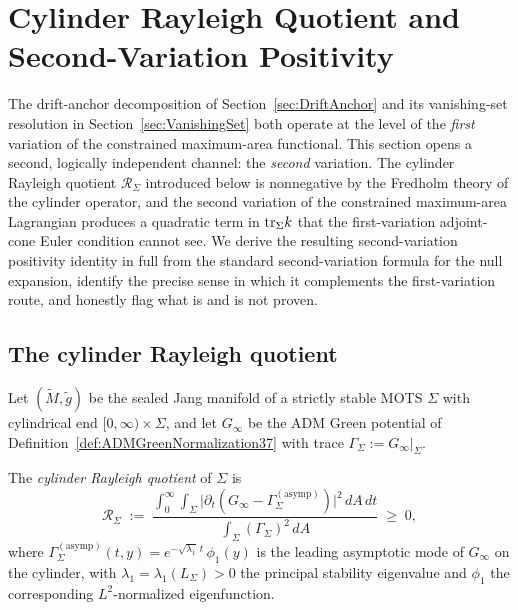 \section{Cylinder Rayleigh Quotient and Second-Variation Positivity}
\label{sec:CylinderRayleigh}

The drift-anchor decomposition of Section~\ref{sec:DriftAnchor} and its vanishing-set resolution in Section~\ref{sec:VanishingSet} both operate at the level of the \emph{first} variation of the constrained maximum-area functional. This section opens a second, logically independent channel: the \emph{second} variation. The cylinder Rayleigh quotient $\mathcal R_\Sigma$ introduced below is nonnegative by the Fredholm theory of the cylinder operator, and the second variation of the constrained maximum-area Lagrangian produces a quadratic term in $\mathrm{tr}_\Sigma k$ that the first-variation adjoint-cone Euler condition cannot see. We derive the resulting second-variation positivity identity in full from the standard second-variation formula for the null expansion, identify the precise sense in which it complements the first-variation route, and honestly flag what is and is not proven.

\subsection{The cylinder Rayleigh quotient}

Let $(\widetilde M,\widetilde g)$ be the sealed Jang manifold of a strictly stable MOTS $\Sigma$ with cylindrical end $[0,\infty)\times\Sigma$, and let $G_\infty$ be the ADM Green potential of Definition~\ref{def:ADMGreenNormalization37} with trace $\Gamma_\Sigma:=G_\infty|_\Sigma$.

\begin{definition}\label{def:CylinderRayleigh}
The \emph{cylinder Rayleigh quotient} of $\Sigma$ is
\begin{equation}\label{eq:CylinderRayleigh}
    \mathcal R_\Sigma
    \;:=\;
    \frac{\displaystyle\int_0^\infty\!\!\int_\Sigma
    \bigl|\partial_t(G_\infty-\Gamma_\Sigma^{(\mathrm{asymp})})\bigr|^2\,dA\,dt}
         {\displaystyle\int_\Sigma (\Gamma_\Sigma)^2\,dA}\;\ge\;0 ,
\end{equation}
where $\Gamma_\Sigma^{(\mathrm{asymp})}(t,y)=e^{-\sqrt{\lambda_1}\,t}\,\phi_1(y)$ is the leading asymptotic mode of $G_\infty$ on the cylinder, with $\lambda_1=\lambda_1(L_\Sigma)>0$ the principal stability eigenvalue and $\phi_1$ the corresponding $L^2$-normalized eigenfunction.
\end{definition}

